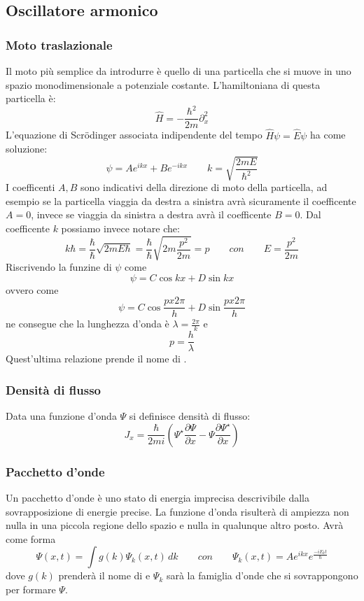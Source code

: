 \subsection{Oscillatore armonico}
\subsubsection{Moto traslazionale}
Il moto più semplice da introdurre è quello di una particella che si muove in uno spazio monodimensionale a potenziale costante. L'hamiltoniana di questa particella è:
$$\hat{H} = - \frac{\hbar^2}{2m} \partial_x^2$$
L'equazione di Scr\"odinger associata indipendente del tempo $\hat{H}\psi = \hat{E}\psi$ ha come soluzione:
$$\psi = A e^{i k x} + B e^{- i k x} \qquad k = \sqrt{\frac{2 m E}{\hbar^2}}$$
I coefficenti $A, B$ sono indicativi della direzione di moto della particella, ad esempio se la particella viaggia da destra a sinistra avrà sicuramente il coefficente $A = 0$, invece se viaggia da sinistra a destra avrà il coefficente $B = 0$.
Dal coefficente $k$ possiamo invece notare che:
$$k\hbar = \frac{\hbar}{\hbar} \sqrt{2 m E \hbar} = \frac{\hbar}{\hbar} \sqrt{2 m \frac{p^2}{2 m}} = p \qquad con \qquad E = \frac{p^2}{2m}$$
Riscrivendo la funzine di $\psi$ come
$$\psi = C \cos{kx} + D \sin{kx}$$
ovvero come
$$\psi = C \cos{\frac{p x 2 \pi}{h}} + D \sin{\frac{p x 2 \pi}{h}}$$
ne consegue che la lunghezza d'onda è $\lambda = \frac{2\pi}{k}$ e
$$p = \frac{h}{\lambda}$$
Quest'ultima relazione prende il nome di .

\subsubsection{Densità di flusso}
Data una funzione d'onda $\Psi$ si definisce densità di flusso:
$$J_x = \frac{\hbar}{2mi}\left(\Psi^{\star} \frac{\partial \Psi}{\partial x} - \Psi \frac{\partial \Psi^{\star}}{\partial x}  \right)$$

\subsubsection{Pacchetto d'onde}
Un pacchetto d'onde è uno stato di energia imprecisa descrivibile dalla sovrapposizione di energie precise.
La funzione d'onda risulterà di ampiezza non nulla in una piccola regione dello spazio e nulla in qualunque altro posto.
Avrà come forma
$$\Psi(x, t) = \int g(k) \Psi_k(x, t) \, dk \qquad con \qquad \Psi_k(x, t) = A e^{ikx} e^{\frac{-i E_k t}{\hbar}}$$
dove $g(k)$ prenderà il nome di  e $\Psi_k$ sarà la famiglia d'onde che si sovrappongono per formare $\Psi$.

